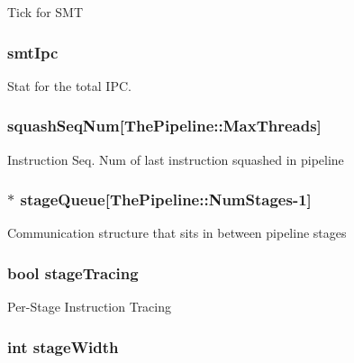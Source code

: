\label{classInOrderCPU_a1ad677a4636a45f2352c8e0e7b2e3b05}
Tick for SMT \hypertarget{classInOrderCPU_a022f90f00731c9b5399eddfda76c6d6b}{
\subsubsection[{smtIpc}]{ {\bf smtIpc}}}
\label{classInOrderCPU_a022f90f00731c9b5399eddfda76c6d6b}
Stat for the total IPC. \hypertarget{classInOrderCPU_a8c48389ee147811c1be413cdd4be4b68}{
\subsubsection[{squashSeqNum}]{ {\bf squashSeqNum}\mbox{[}{\bf ThePipeline::MaxThreads}\mbox{]}}}
\label{classInOrderCPU_a8c48389ee147811c1be413cdd4be4b68}
Instruction Seq. Num of last instruction squashed in pipeline \hypertarget{classInOrderCPU_a410cb84ca396b18b7b6cd9b5999bc9c8}{
\subsubsection[{stageQueue}]{$\ast$ {\bf stageQueue}\mbox{[}{\bf ThePipeline::NumStages}-\/1\mbox{]}}}
\label{classInOrderCPU_a410cb84ca396b18b7b6cd9b5999bc9c8}
Communication structure that sits in between pipeline stages \hypertarget{classInOrderCPU_a202139c46c2d06ae2263b4d3bfc27f1a}{
\subsubsection[{stageTracing}]{\setlength{\rightskip}{0pt plus 5cm}bool {\bf stageTracing}}}
\label{classInOrderCPU_a202139c46c2d06ae2263b4d3bfc27f1a}
Per-\/Stage Instruction Tracing \hypertarget{classInOrderCPU_a60be67c646e9cf5778b1eb73436194dc}{
\subsubsection[{stageWidth}]{\setlength{\rightskip}{0pt plus 5cm}int {\bf stageWidth}}}
